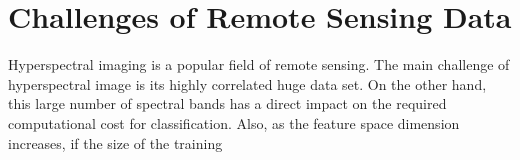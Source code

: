 \documentclass[document.tex]{subfiles}
\begin{document}
\section{Challenges of Remote Sensing Data}
\noindent Hyperspectral imaging is a popular field of remote sensing. The main challenge of hyperspectral image is its highly correlated huge data set. On the other hand, this large number of spectral bands has a direct impact on the required computational cost for classification. Also, as the feature space dimension increases, if the size of the training 

\end{document}
